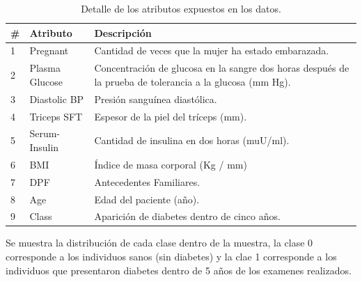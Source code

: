 \documentclass[letter, titlepage, 10pt]{article}
\begin{document}
\begin{table}[H]
\centering
\begin{tabular}{|l|l|p{12cm}|}
\hline
\textbf{\#} & \textbf{Atributo} & \textbf{Descripción}                                                                                                    \\ \hline
1           & Pregnant          & Cantidad de veces que la mujer ha estado embarazada.                                                                    \\ \hline
2           & Plasma Glucose    & Concentración de glucosa en la sangre dos horas después de la prueba de tolerancia a la glucosa (mm Hg). \\ \hline
3           & Diastolic BP      & Presión sanguínea diastólica.                                                                                           \\ \hline
4           & Triceps SFT       & Espesor de la piel del tríceps (mm).                                                                            \\ \hline
5           & Serum-Insulin     & Cantidad de insulina en dos horas (muU/ml).                                                                                   \\ \hline
6           & BMI               & Índice de masa corporal (Kg / mm)                                                                       \\ \hline
7           & DPF               & Antecedentes Familiares.                                                                                          \\ \hline
8           & Age               & Edad del paciente (año).                                                                                                \\ \hline
9           & Class             & Aparición de diabetes dentro de cinco años.                                                                             \\ \hline
\end{tabular}
\caption{Detalle de los atributos expuestos en los datos.}
\end{table}

Se muestra la distribución de cada clase dentro de la muestra, la clase 0 corresponde a los individuos sanos (sin diabetes) y la clae 1 corresponde a los individuos que presentaron diabetes dentro de 5 años de los examenes realizados.
\end{document}
